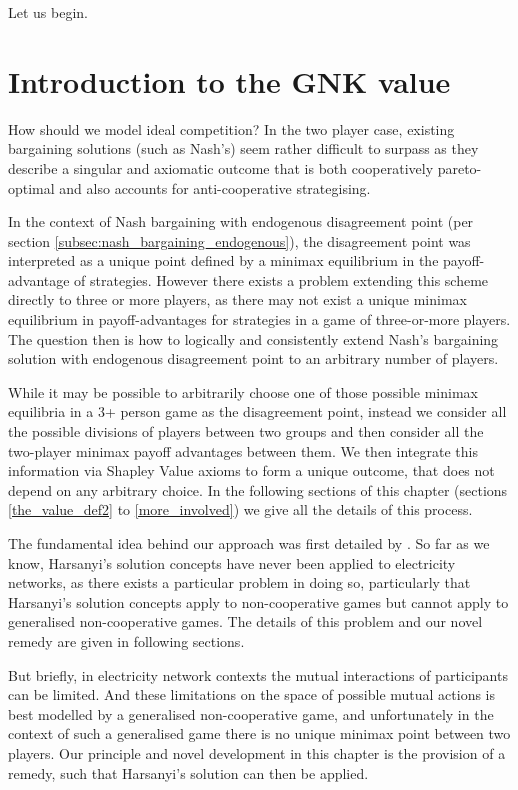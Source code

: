 Let us begin.

\section{Introduction to the GNK value}\label{sec:introduction_gnk_sec}

How should we model ideal competition? In the two player case, existing bargaining solutions (such as Nash's) seem rather difficult to surpass as they describe a singular and axiomatic outcome that is both cooperatively pareto-optimal and also accounts for anti-cooperative strategising.

In the context of Nash bargaining with endogenous disagreement point (per section \ref{subsec:nash_bargaining_endogenous}), the disagreement point was interpreted as a unique point defined by a minimax equilibrium in the payoff-advantage of strategies.
However there exists a problem extending this scheme directly to three or more players, as there may not exist a unique minimax equilibrium in payoff-advantages for strategies in a game of three-or-more players.
The question then is how to logically and consistently extend Nash's bargaining solution with endogenous disagreement point to an arbitrary number of players.

While it may be possible to arbitrarily choose one of those possible minimax equilibria in a 3+ person game as the disagreement point, 
instead we consider all the possible divisions of players between two groups and then consider all the two-player minimax payoff advantages between them. We then integrate this information via Shapley Value axioms to form a unique outcome, that does not depend on any arbitrary choice.
In the following sections of this chapter (sections \ref{the_value_def2} to \ref{more_involved}) we give all the details of this process.%

The fundamental idea behind our approach was first detailed by \cite{values3}.
So far as we know, Harsanyi's solution concepts have never been applied to electricity networks, as there exists a particular problem in doing so, particularly that Harsanyi's solution concepts apply to non-cooperative games but cannot apply to generalised non-cooperative games.
The details of this problem and our novel remedy are given in following sections.

But briefly, in electricity network contexts the mutual interactions of participants can be limited.
And these limitations on the space of possible mutual actions is best modelled by a generalised non-cooperative game, and unfortunately in the context of such a generalised game there is no unique minimax point between two players.
Our principle and novel development in this chapter is the provision of a remedy, such that Harsanyi's solution can then be applied.

